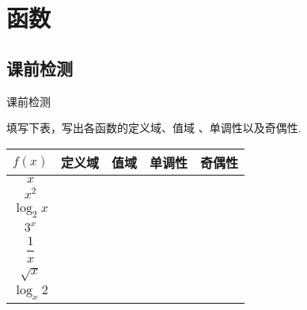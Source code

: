 \section{函数}
  \subsection{课前检测}
  \begin{exercise}{\heiti 课前检测}\\
    \item
      填写下表，写出各函数的定义域、值域 、单调性以及奇偶性.
      \begin{center}
        \renewcommand{\arraystretch}{1.4}
        \begin{tabular}{|c|c|c|c|c|}
          \hline
        $f(x)$&\mbox{\hspace{1.5em}定义域\hspace{1.5em}}&\mbox{\hspace{2em}值域\hspace{2em}}&\mbox{\hspace{8em}单调性\hspace{8em}}&\mbox{\hspace{1.2em}奇偶性\hspace{1.2em}}\\
          \hline
          $x$&&&&\\
          \hline
          $x^2$&&&&\\
          \hline
          $\log_2x$&&&&\\
          \hline
          $3^x$&&&&\\
          \hline
          $\dfrac{1}{x}$&&&&\\
          \hline
          $\sqrt{x}$&&&&\\
          \hline
          $\log_x2$&&&&\\
          \hline
        \end{tabular}\\
      \end{center}
  \end{exercise}
